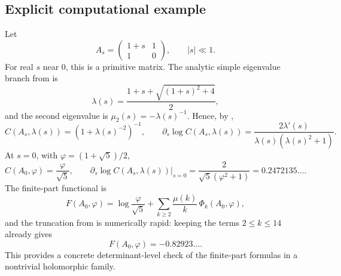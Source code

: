 \subsection{Explicit computational example}

\begin{remark}
  \label{rem:example-golden-mean}
  Let
  \[
    A_s=
    \begin{pmatrix}
      1+s & 1 \\
      1   & 0
    \end{pmatrix},
    \qquad |s|\ll 1.
  \]
  For real \(s\) near \(0\), this is a primitive matrix. The analytic
  simple eigenvalue branch from  is
  \[
    \lambda(s)=\frac{1+s+\sqrt{(1+s)^2+4}}{2},
  \]
  and the second eigenvalue is \(\mu_2(s)=-\lambda(s)^{-1}\). Hence,
  by ,
  \[
    C(A_s,\lambda(s))
    =\left(1+\lambda(s)^{-2}\right)^{-1},
    \qquad
    \partial_s\log C(A_s,\lambda(s))
    =\frac{2\lambda'(s)}{\lambda(s)(\lambda(s)^2+1)}.
  \]
  At \(s=0\), with \(\varphi=(1+\sqrt5)/2\),
  \[
    C(A_0,\varphi)=\frac{\varphi}{\sqrt5},
    \qquad
    \left.\partial_s\log C(A_s,\lambda(s))\right|_{s=0}
    =\frac{2}{\sqrt5(\varphi^2+1)}
    =0.2472135\ldots.
  \]
  The finite-part functional is
  \[
    F(A_0,\varphi)
    =\log\frac{\varphi}{\sqrt5}
      +\sum_{k\ge 2}\frac{\mu(k)}{k}\,
        \Phi_k(A_0,\varphi),
  \]
  and the truncation from  is
  numerically rapid: keeping the terms \(2\le k\le 14\) already gives
  \[
    F(A_0,\varphi)=-0.82923\ldots.
  \]
  This provides a concrete determinant-level check of the finite-part
  formulas in a nontrivial holomorphic family.
\end{remark}
